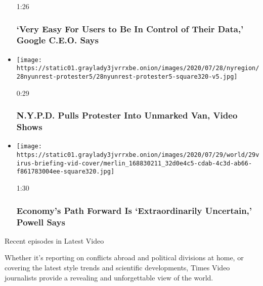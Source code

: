 \begin{itemize}
  1:26

  \hypertarget{very-easy-for-users-to-be-in-control-of-their-data-google-ceo-says}{%
  \subsubsection{`Very Easy For Users to Be In Control of Their Data,'
  Google C.E.O.
  Says}\label{very-easy-for-users-to-be-in-control-of-their-data-google-ceo-says}}
\item
  \href{https://www.nytimes3xbfgragh.onion/video/us/100000007262950/nypd-unmarked-van.html?action=click\&module=video-series-bar\&region=header\&pgtype=Article\&playlistId=video/latest-video}{}

  \texttt{[image: https://static01.graylady3jvrrxbe.onion/images/2020/07/28/nyregion/28nyunrest-protester5/28nyunrest-protester5-square320-v5.jpg]}

  0:29

  \hypertarget{nypd-pulls-protester-into-unmarked-van-video-shows}{%
  \subsubsection{N.Y.P.D. Pulls Protester Into Unmarked Van, Video
  Shows}\label{nypd-pulls-protester-into-unmarked-van-video-shows}}
\item
  \href{https://www.nytimes3xbfgragh.onion/video/us/100000007262574/fed-powell-economy-coronavirus.html?action=click\&module=video-series-bar\&region=header\&pgtype=Article\&playlistId=video/latest-video}{}

  \texttt{[image: https://static01.graylady3jvrrxbe.onion/images/2020/07/29/world/29virus-briefing-vid-cover/merlin\_168830211\_32d0e4c5-cdab-4c3d-ab66-f861783004ee-square320.jpg]}

  1:30

  \hypertarget{economys-path-forward-is-extraordinarily-uncertain-powell-says}{%
  \subsubsection{Economy's Path Forward Is `Extraordinarily Uncertain,'
  Powell
  Says}\label{economys-path-forward-is-extraordinarily-uncertain-powell-says}}
\end{itemize}

Recent episodes in Latest Video

Whether it's reporting on conflicts abroad and political divisions at
home, or covering the latest style trends and scientific developments,
Times Video journalists provide a revealing and unforgettable view of
the world.


